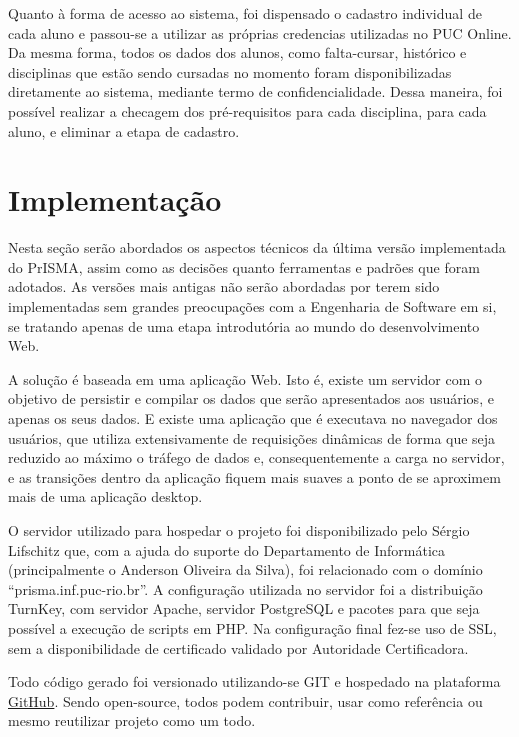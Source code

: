\documentclass[graduacao,brazil]{ThesisPUC}
\begin{document}
Quanto à forma de acesso ao sistema, foi dispensado o cadastro individual de cada aluno e passou-se a utilizar as próprias credencias utilizadas no PUC Online. Da mesma forma, todos os dados dos alunos, como falta-cursar, histórico e disciplinas que estão sendo cursadas no momento foram disponibilizadas diretamente ao sistema, mediante termo de confidencialidade. Dessa maneira, foi possível realizar a checagem dos pré-requisitos para cada disciplina, para cada aluno, e eliminar a etapa de cadastro.



\chapter{Implementação}

Nesta seção serão abordados os aspectos técnicos da última versão implementada do PrISMA, assim como as decisões quanto ferramentas e padrões que foram adotados. As versões mais antigas não serão abordadas por terem sido implementadas sem grandes preocupações com a Engenharia de Software em si, se tratando apenas de uma etapa introdutória ao mundo do desenvolvimento Web.

A solução é baseada em uma aplicação Web. Isto é, existe um servidor com o objetivo de persistir e compilar os dados que serão apresentados aos usuários, e apenas os seus dados. E existe uma aplicação que é executava no navegador dos usuários, que utiliza extensivamente de requisições dinâmicas de forma que seja reduzido ao máximo o tráfego de dados e, consequentemente a carga no servidor, e as transições dentro da aplicação fiquem mais suaves a ponto de se aproximem mais de uma aplicação desktop.

O servidor utilizado para hospedar o projeto foi disponibilizado pelo Sérgio Lifschitz que, com a ajuda do suporte do Departamento de Informática (principalmente o Anderson Oliveira da Silva), foi relacionado com o domínio “prisma.inf.puc-rio.br”. A configuração utilizada no servidor foi a distribuição TurnKey, com servidor Apache, servidor PostgreSQL e pacotes para que seja possível a execução de scripts em PHP. Na configuração final fez-se uso de SSL, sem a disponibilidade de certificado validado por Autoridade Certificadora.

Todo código gerado foi versionado utilizando-se GIT e hospedado na plataforma \href{https://github.com/PrismaDev/prisma}{GitHub}. Sendo open-source, todos podem contribuir, usar como referência ou mesmo reutilizar projeto como um todo.
\end{document}
